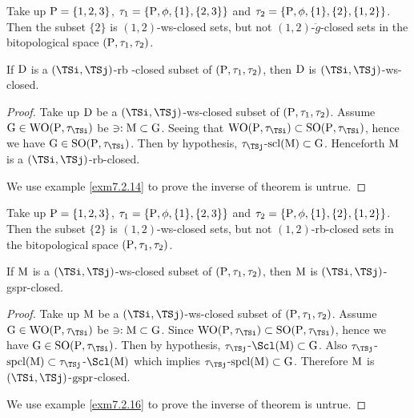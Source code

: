 \begin{exm}\label{exm7.2.12}
Take up $\mathrm{P}= \{1,2,3\}$, $\tau_1 =\{\mathrm{P}, \phi, \{1\}, \{2, 3\}\}$ and $\tau_2 =\{\mathrm{P}, \phi, \{1\}, \{2\}, \{1, 2\}\}$. Then the subset $\{2\}$ is $(1, 2)$-ws-closed sets, but not $(1, 2)$-$\ddot{g}$-closed sets in the bitopological space $(\mathrm{P}, \tau_1 , \tau_2 )$.
\end{exm}

\begin{thm}\label{thm7.2.13}
If $\mathrm{D}$ is a $(\TSi, \TSj)$-rb -closed subset of $(\mathrm{P}, \tau_1 , \tau_2 )$, then $\mathrm{D}$ is $(\TSi, \TSj)$-ws-closed.
\end{thm}

\begin{proof}
Take up $\mathrm{D}$ be a $(\TSi, \TSj)$-ws-closed subset of $(\mathrm{P}, \tau_1 , \tau_2)$. Assume $\TSG\in\TSW\TSO(\TSP, \tau_{\TSi})$ be $\ni: \mathrm{M} \subset \mathrm{G}$. Seeing that $\TSW\TSO(\TSP, \tau_{\TSi} ) \subset \TSS\TSO(\TSP, \tau_{\TSi})$, hence we have $\TSG\in\TSS\TSO(\TSP, \tau_{\TSi})$. Then by hypothesis, $\tau_{\TSj}$-$\mathrm{scl}(\mathrm{M}) \subset \mathrm{G}$. Henceforth $\mathrm{M}$ is a $(\TSi, \TSj)$-rb-closed.

We use example \ref{exm7.2.14} to prove the inverse of theorem is untrue.
\end{proof}

\begin{exm}\label{exm7.2.14}
Take up $\mathrm{P}= \{1,2,3\}$, $\tau_1 =\{\mathrm{P}, \phi, \{1\}, \{2, 3\}\}$ and $\tau_2 =\{\mathrm{P}, \phi, \{1\}, \{2\}, \{1, 2\}\}$. Then the subset $\{2\}$ is $(1, 2)$-ws-closed sets, but not $(1, 2)$-rb-closed sets in the bitopological space $(\mathrm{P}, \tau_1 , \tau_2 )$.
\end{exm}

\begin{thm}\label{thm7.2.15}
If $\mathrm{M}$ is a $(\TSi, \TSj)$-ws-closed subset of $(\mathrm{P}, \tau_1 , \tau_2 )$, then $\mathrm{M}$ is $(\TSi, \TSj)$-gspr-closed.
\end{thm}

\begin{proof}
Take up $\mathrm{M}$ be a $(\TSi, \TSj)$-ws-closed subset of $(\mathrm{P}, \tau_1 , \tau_2 )$. Assume $\TSG\in\TSW\TSO(\TSP, \tau_{\TSi} )$ be $\ni: \mathrm{M} \subset \mathrm{G}$. Since $\TSW\TSO(\TSP, \tau_{\TSi} ) \subset \TSS\TSO(\TSP, \tau_{\TSi} )$, hence we have $\TSG\in\TSS\TSO(\TSP, \tau_{\TSi} )$. Then by hypothesis, $\tau_{\TSj}$-$\Scl(\TSM) \subset \TSG$. Also $\tau_{\TSj}$-$\spcl(\TSM) \subset \tau_{\TSj}$-$\Scl(\TSM)$ which implies $\tau_{\TSj}$-$\mathrm{spcl}(\mathrm{M})\subset \mathrm{G}$. Therefore $\mathrm{M}$ is $(\TSi, \TSj)$-$\mathrm{gspr}$-closed.

We use example \ref{exm7.2.16} to prove the inverse of theorem is untrue.
\end{proof}

